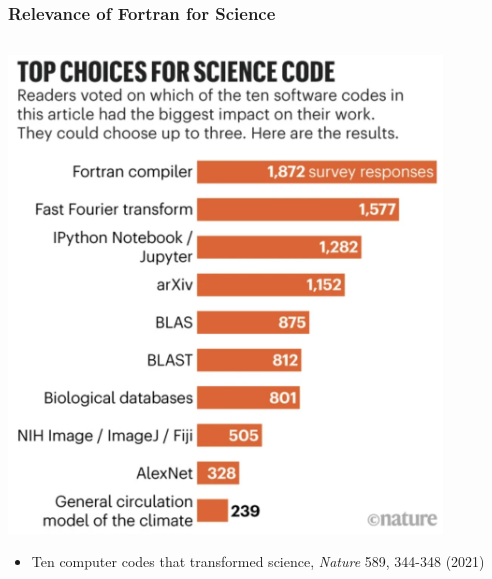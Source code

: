 \documentclass[aspectratio=169]{beamer}
\begin{document}
\begin{frame}
\frametitle{Relevance of Fortran for Science}
\begin{columns}[T] %
\begin{column}{.38\textwidth}
\centering
\includegraphics[width=0.9\textwidth]{nature_screenshot}
\begin{itemize}
    \item \footnotesize Ten computer codes that transformed science, \textit{Nature} 589, 344-348 (2021)
\end{itemize}
\end{column}%
\hfill%
\begin{column}{.6\textwidth}


\end{column}
\end{columns}
\end{frame}
\end{document}
